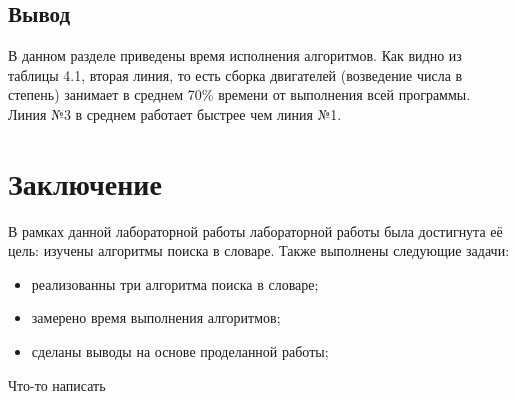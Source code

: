\documentclass[12pt]{report}
\begin{document}
\section*{Вывод}
	
В данном разделе приведены время исполнения алгоритмов. Как видно из таблицы 4.1, вторая линия, то есть сборка двигателей (возведение числа в степень) занимает в среднем 70\% времени от выполнения всей программы. Линия №3 в среднем работает быстрее чем линия №1.
	
\chapter*{Заключение}
	
В рамках данной лабораторной работы лабораторной работы была достигнута её цель: изучены алгоритмы поиска в словаре. Также выполнены следующие задачи:
	
\begin{itemize}
	\item реализованны три алгоритма поиска в словаре;
	\item замерено время выполнения алгоритмов;
	\item сделаны выводы на основе проделанной работы;
\end{itemize}

Что-то написать

	
\end{document}
